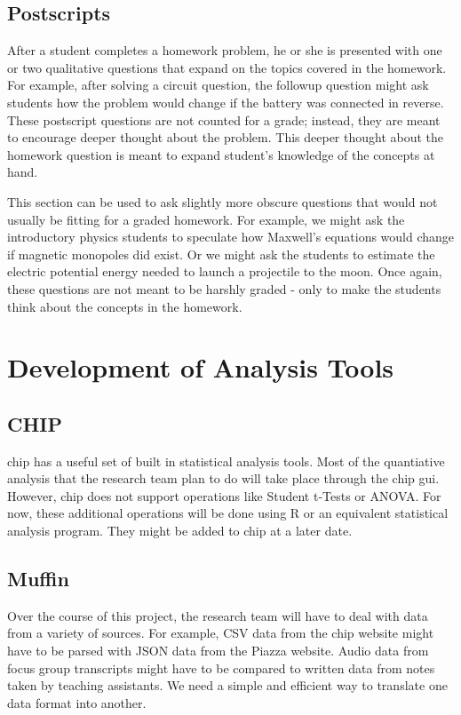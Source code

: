 \subsection{Postscripts}

After a student completes a homework problem, he or she is presented with one or two qualitative questions that expand on the topics covered in the homework. For example, after solving a circuit question, the followup question might ask students how the problem would change if the battery was connected in reverse. These postscript questions are not counted for a grade; instead, they are meant to encourage deeper thought about the problem. This deeper thought about the homework question is meant to expand student’s knowledge of the concepts at hand.

This section can be used to ask slightly more obscure questions that would not usually be fitting for a graded homework. For example, we might ask the introductory physics students to speculate how Maxwell's equations would change if magnetic monopoles did exist. Or we might ask the students to estimate the electric potential energy needed to launch a projectile to the moon. Once again, these questions are not meant to be harshly graded - only to make the students think about the concepts in the homework.

\section{Development of Analysis Tools}

\subsection{CHIP}

\gls{chip} has a useful set of built in statistical analysis tools. Most of the quantiative analysis that the research team plan to do will take place through the \gls{chip} \gls{gui}. However, \gls{chip} does not support operations like Student t-Tests or ANOVA. For now, these additional operations will be done using R or an equivalent statistical analysis program. They might be added to \gls{chip} at a later date.

\subsection{Muffin}

Over the course of this project, the research team will have to deal with data from a variety of sources. For example, CSV data from the \gls{chip} website might have to be parsed with JSON data from the Piazza website. Audio data from focus group transcripts might have to be compared to written data from notes taken by teaching assistants. We need a simple and efficient way to translate one data format into another.

